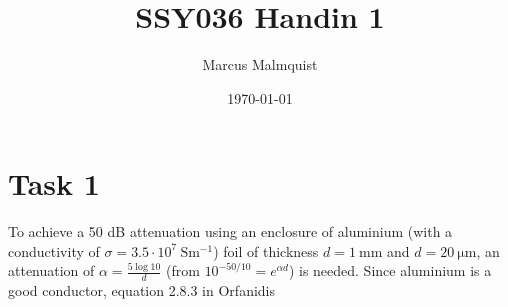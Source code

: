 \message{ !name(Handin_1.tex)}\documentclass[12pt,a4paper]{article}
\begin{document}


\title{SSY036 Handin 1}
\author{Marcus Malmquist}
\date{\today}
\maketitle

\begin{abstract}

\end{abstract}

\newpage
\tableofcontents
\newpage

\section{Task 1}
To achieve a 50 dB attenuation using an enclosure of aluminium (with a conductivity of $\sigma = 3.5\cdot 10^{7}\SI{}{\siemens\metre^{-1}}$) foil of thickness $d=\SI{1}{\milli\meter}$ and $d=\SI{20}{\micro\metre}$, an attenuation of $\alpha = \frac{5\log{10}}{d}$ (from $10^{-50/10}=e^{\alpha d}$) is needed. Since aluminium is a good conductor, equation 2.8.3 in Orfanidis
\subsection{}


\end{document}
